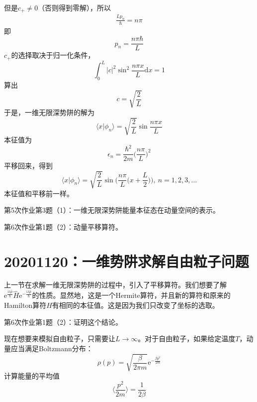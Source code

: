        但是$c_+ \neq 0$（否则得到零解），所以
        \begin{equation}\begin{aligned}
            \frac {Lp_n}{\hbar} = n\pi
        \end{aligned}\end{equation}
        即
        \[ p_n = \frac {n\pi \hbar}{L} \]
        $c_+$的选择取决于归一化条件，
        \[ \int_0^L |c|^2 \sin^2{\frac {n\pi x}L}\mathrm{d}x = 1 \]
        算出
        \[ c = \sqrt{\frac 2L} \]
        于是，一维无限深势阱的解为
        \[ \langle x|\phi_n \rangle = \sqrt{\frac 2L} \sin{\frac {n\pi x}L} \]
        本征值为
        \[ \epsilon_n = \frac {\hbar^2}{2m} \bigg(\frac {n\pi}L\bigg)^2 \]
        平移回来，得到
        \[ \langle x|\phi_n \rangle = \sqrt{\frac 2L} \sin{\bigg(\frac {n\pi}L\bigg(x+\frac L2\bigg)\bigg)}, \ n=1,2,3,... \]
        本征值和平移前一样。
        \begin{asg}
            第5次作业第3题（1）：一维无限深势阱能量本征态在动量空间的表示。
        \end{asg}
        \begin{asg}
            第6次作业第1题（2）：动量平移算符。
        \end{asg}

    \section{20201120：一维势阱求解自由粒子问题}
        上一节在求解一维无限深势阱的过程中，引入了平移算符。我们想要了解$\mathrm{e}^{\frac {\mathrm{i}\lambda \hat{p}}{\hbar}} \hat{H} \mathrm{e}^{-\frac {\mathrm{i}\lambda \hat{p}}{\hbar}}$的性质。显然地，这是一个Hermite算符，并且新的算符和原来的Hamilton算符$\hat{H}$有相同的本征值。这是因为我们只改变了坐标的选取。
        \begin{asg}
            第6次作业第1题（2）：证明这个结论。
        \end{asg}
        现在想要来模拟自由粒子，只需要让$L \to \infty$。对于自由粒子，如果给定温度$T$，动量应当满足Boltzmann分布：
        \[ \rho(p) = \sqrt{\frac {\beta}{2\pi m}}\mathrm{e}^{-\frac {\beta p^2}{2m}} \]
        计算能量的平均值
        \[ \langle \frac {p^2}{2m} \rangle = \frac 1{2\beta} \]

